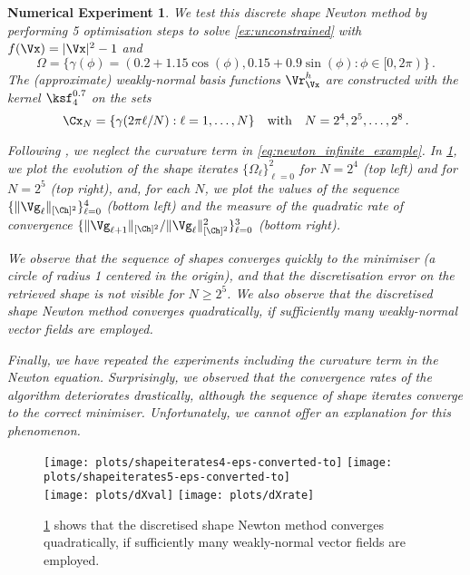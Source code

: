 \documentclass{siamart1116}
\newtheorem{numexp}[theorem]{Numerical Experiment}
\numberwithin{theorem}{section}
\begin{document}
\begin{numexp}\label{numexp:Newton}
We test this discrete shape Newton method by performing 5 optimisation steps
to solve \cref{ex:unconstrained} with $f(\Vx) = \vert \Vx \vert^2 -1$ and
\begin{equation}
\Omega = \{ \gamma(\phi) = (0.2 + 1.15\cos(\phi), 0.15 + 0.9\sin(\phi): \phi \in [0, 2\pi)\}\,.
\end{equation}
The (approximate) weakly-normal basis functions $\Vr^h_\Vx$ are constructed with the kernel $\ksf_4^{0.7}$
on the sets
\begin{equation}
\Cx_N = \{\gamma(2\pi\ell /N): \ell = 1,\dots, N\} \quad \text{with}\quad N=2^{4},2^{5},\dots,2^{8}\,.
\end{equation}

Following \cite{sturm3, Schulz1}, we neglect the curvature term in \cref{eq:newton_infinite_example}.
In \cref{fig:newton}, we plot the evolution of the shape iterates $\{\Omega_\ell\}_{\ell=0}^2$
for $N = 2^4$ (top left) and for $N = 2^5$ (top right),
and, for each $N$, we plot the values of the sequence
$\{\Vert \Vg_{\ell}\Vert_{[\Ch]^2}\}_{\ell=0}^4$ (bottom left)
and the measure of the quadratic rate of convergence 
$\{\Vert \Vg_{\ell+1}\Vert_{[\Ch]^2}/\Vert \Vg_{\ell}\Vert_{[\Ch]^2}^2\}_{\ell=0}^3$
(bottom right).

We observe that the sequence of shapes converges quickly to the minimiser
(a circle of radius 1 centered in the origin), and that the discretisation error
on the retrieved shape is not visible for $N\geq 2^5$.
We also observe that the discretised shape Newton method converges quadratically,
if sufficiently many weakly-normal vector fields are employed.

Finally, we have repeated the experiments including the curvature
term in the Newton equation. Surprisingly, we observed that the convergence
rates of the algorithm deteriorates drastically, although the sequence of shape
iterates converge to the correct minimiser. Unfortunately, we cannot offer
an explanation for this phenomenon.
\end{numexp}

\begin{figure}[htb!]
\texttt{[image: plots/shapeiterates4-eps-converted-to]}
\hfill
\texttt{[image: plots/shapeiterates5-eps-converted-to]}
\\
\texttt{[image: plots/dXval]}
\hfill
\texttt{[image: plots/dXrate]}
\caption{\cref{numexp:Newton} shows that the discretised shape Newton method
converges quadratically, if sufficiently many weakly-normal vector fields are employed.}
\label{fig:newton}
\end{figure}
\end{document}
